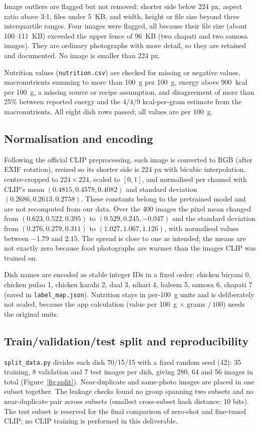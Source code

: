 \documentclass[11pt,a4paper]{article}
\begin{document}
Image outliers are flagged but not removed: shorter side below 224 px, aspect ratio above 3:1, files under 5~KB, and width, height or file size beyond three interquartile ranges. Four images were flagged, all because their file size (about 100--111~KB) exceeded the upper fence of 96~KB (two chapati and two samosa images). They are ordinary photographs with more detail, so they are retained and documented. No image is smaller than 224 px.

Nutrition values (\texttt{nutrition.csv}) are checked for missing or negative values, macronutrients summing to more than 100~g per 100~g, energy above 900~kcal per 100~g, a missing source or recipe assumption, and disagreement of more than 25\% between reported energy and the 4/4/9 kcal-per-gram estimate from the macronutrients. All eight dish rows passed; all values are per 100~g.

\subsection{Normalisation and encoding}
Following the official CLIP preprocessing, each image is converted to RGB (after EXIF rotation), resized so its shorter side is 224 px with bicubic interpolation, centre-cropped to $224\times224$, scaled to $[0,1]$, and normalised per channel with CLIP's mean $(0.4815, 0.4578, 0.4082)$ and standard deviation $(0.2686, 0.2613, 0.2758)$. These constants belong to the pretrained model and are not recomputed from our data. Over the 400 images the pixel mean changed from $(0.623, 0.522, 0.395)$ to $(0.529, 0.245, -0.047)$ and the standard deviation from $(0.276, 0.279, 0.311)$ to $(1.027, 1.067, 1.126)$, with normalised values between $-1.79$ and $2.15$. The spread is close to one as intended; the means are not exactly zero because food photographs are warmer than the images CLIP was trained on.

Dish names are encoded as stable integer IDs in a fixed order: chicken biryani 0, chicken pulao 1, chicken karahi 2, daal 3, nihari 4, haleem 5, samosa 6, chapati 7 (saved in \texttt{label\_map.json}). Nutrition stays in per-100~g units and is deliberately not scaled, because the app calculation (value per 100~g $\times$ grams $/\,100$) needs the original units.

\subsection{Train/validation/test split and reproducibility}
\texttt{split\_data.py} divides each dish 70/15/15 with a fixed random seed (42): 35 training, 8 validation and 7 test images per dish, giving 280, 64 and 56 images in total (Figure~\ref{fig:split}). Near-duplicate and same-photo images are placed in one subset together. The leakage checks found no group spanning two subsets and no near-duplicate pair across subsets (smallest cross-subset hash distance: 10 bits). The test subset is reserved for the final comparison of zero-shot and fine-tuned CLIP; no CLIP training is performed in this deliverable.
\end{document}
